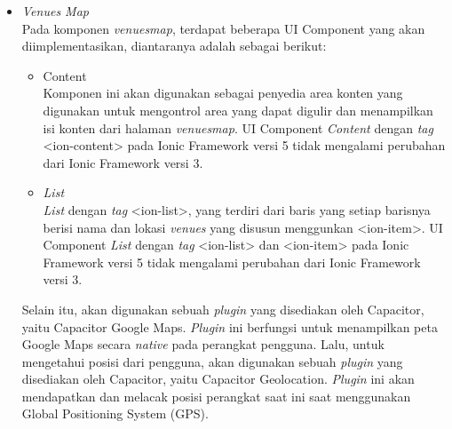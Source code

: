 \begin{itemize}
	\item \textit{Venues Map}\\
	Pada komponen \textit{venues\textunderscore map}, terdapat beberapa UI Component yang akan diimplementasikan, diantaranya adalah sebagai berikut:
	\begin{itemize}
			\item Content \\
		Komponen ini akan digunakan sebagai penyedia area konten yang digunakan untuk mengontrol area yang dapat digulir dan menampilkan isi konten dari halaman \textit{venues\textunderscore map}. UI Component \textit{Content} dengan \textit{tag} <ion-content> pada Ionic Framework versi 5 tidak mengalami perubahan dari Ionic Framework versi 3.
			\item \textit{List} \\
		\textit{List} dengan \textit{tag} <ion-list>, yang terdiri dari baris yang setiap barisnya berisi nama dan lokasi \textit{venues} yang disusun menggunkan <ion-item>. UI Component \textit{List} dengan \textit{tag} <ion-list> dan <ion-item> pada Ionic Framework versi 5 tidak mengalami perubahan dari Ionic Framework versi 3.
		\end{itemize}
	
	Selain itu, akan digunakan sebuah \textit{plugin} yang disediakan oleh Capacitor, yaitu Capacitor Google Maps. \textit{Plugin} ini berfungsi untuk menampilkan peta Google Maps secara \textit{native} pada perangkat pengguna. Lalu, untuk mengetahui posisi dari pengguna, akan digunakan sebuah \textit{plugin} yang disediakan oleh Capacitor, yaitu Capacitor Geolocation. \textit{Plugin} ini akan mendapatkan dan melacak posisi perangkat saat ini saat menggunakan Global Positioning System (GPS). 
\end{itemize}

